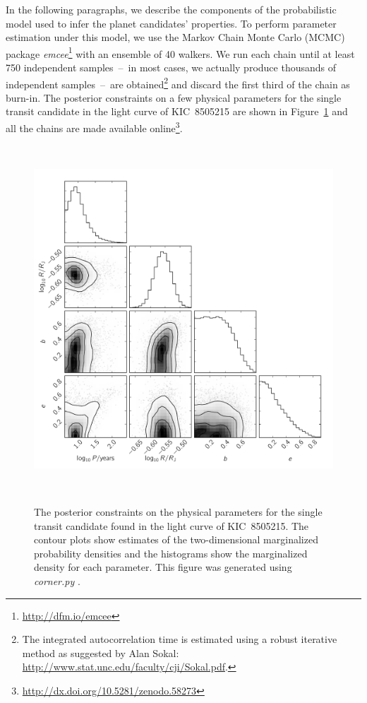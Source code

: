 \documentclass[manuscript, letterpaper]{aastex6}
\newcommand{\project}[1]{\textsl{#1}}
\newcommand{\emcee}{\project{emcee}}
\newcommand{\dfmfigref}[1]{\ref{fig:#1}}
\newcommand{\dfmFig}[1]{Figure~\dfmfigref{#1}}
\newcommand{\dfmfig}[1]{\dfmFig{#1}}
\newcommand{\dfmfiglabel}[1]{\label{fig:#1}}
\newcommand{\datareleaseurl}{\url{http://dx.doi.org/10.5281/zenodo.58273}}
\begin{document}
In the following paragraphs, we describe the components of the probabilistic
model used to infer the planet candidates' properties.
To perform parameter estimation under this model, we use the Markov Chain
Monte Carlo (MCMC) package \emcee\footnote{\url{http://dfm.io/emcee}}
\citep{Foreman-Mackey:2013} with an ensemble of 40 walkers.
We run each chain until at least 750 independent samples~--~in most cases, we
actually produce thousands of independent samples~--~are obtained\footnote{The
integrated autocorrelation time is estimated using a robust iterative method
as suggested by Alan Sokal:
\url{http://www.stat.unc.edu/faculty/cji/Sokal.pdf}.} and discard the first
third of the chain as burn-in.
The posterior constraints on a few physical parameters for the single transit
candidate in the light curve of KIC~8505215 are shown in \dfmfig{corner} and
all the chains are made available online\footnote{\datareleaseurl}.

\begin{figure}~\\
\begin{center}
\includegraphics[width=\textwidth]{figures/params/8505215.pdf}
\end{center}
\caption{%
The posterior constraints on the physical parameters for the single transit
candidate found in the light curve of KIC~8505215.
The contour plots show estimates of the two-dimensional marginalized
probability densities and the histograms show the marginalized density for
each parameter.
This figure was generated using \project{corner.py}
\citep{Foreman-Mackey:2016}.
\dfmfiglabel{corner}}~\\
\end{figure}
\end{document}
